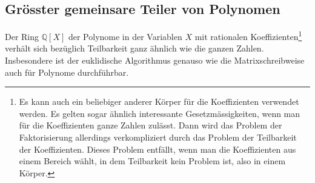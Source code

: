 \subsection{Grösster gemeinsare Teiler von Polynomen}
Der Ring $\mathbb{Q}[X]$ der Polynome in der Variablen $X$ mit rationalen
Koeffizienten\footnote{Es kann auch ein beliebiger anderer Körper für
die Koeffizienten verwendet werden.
Es gelten sogar ähnlich interessante Gesetzmässigkeiten, wenn man für
die Koeffizienten ganze Zahlen zulässt.
Dann wird das Problem der Faktorisierung allerdings verkompliziert 
durch das Problem der Teilbarkeit der Koeffizienten.
Dieses Problem entfällt, wenn man die Koeffizienten aus einem
Bereich wählt, in dem Teilbarkeit kein Problem ist, also in einem Körper.}
verhält
sich bezüglich Teilbarkeit ganz ähnlich wie die ganzen Zahlen.
Insbesondere ist der euklidische Algorithmus genauso wie die
Matrixschreibweise auch für Polynome durchführbar.

